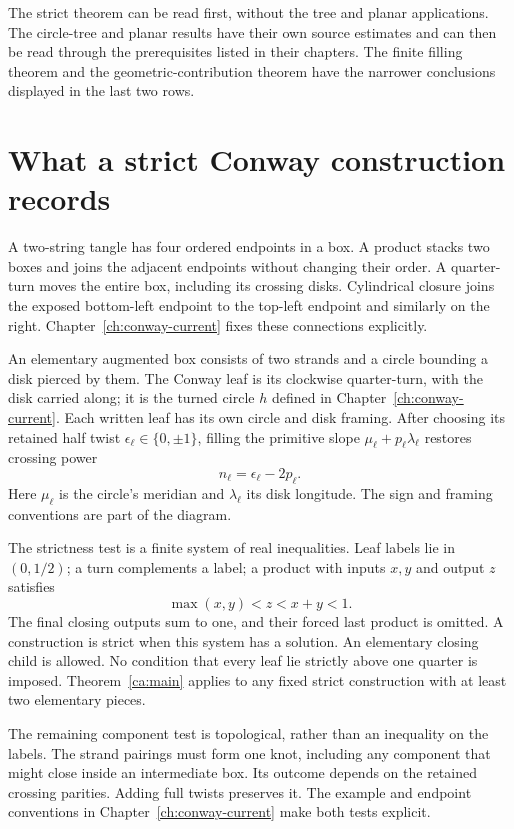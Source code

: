 The strict theorem can be read first, without the tree and planar applications.
The circle-tree and planar results have their own source estimates
and can then be read through the prerequisites listed in their
chapters. The finite filling theorem and the geometric-contribution
theorem have the narrower conclusions displayed in the last two
rows.

\section{What a strict Conway construction records}
\label{sec:geometric-construction}

A two-string tangle has four ordered endpoints in a box. A product
stacks two boxes and joins the adjacent endpoints without changing
their order. A quarter-turn moves the entire box, including its
crossing disks. Cylindrical closure joins the exposed bottom-left
endpoint to the top-left endpoint and similarly on the right.
Chapter~\ref{ch:conway-current} fixes these connections explicitly.

An elementary augmented box consists of two strands and a circle
bounding a disk pierced by them. The Conway leaf is its clockwise
quarter-turn, with the disk carried along; it is the turned circle
$h$ defined in Chapter~\ref{ch:conway-current}. Each written leaf has
its own circle and disk framing. After choosing its retained half twist
$\epsilon_\ell\in\{0,\pm1\}$, filling the primitive slope
$\mu_\ell+p_\ell\lambda_\ell$ restores crossing power
\[
                   n_\ell=\epsilon_\ell-2p_\ell.
\]
Here $\mu_\ell$ is the circle's meridian and $\lambda_\ell$ its
disk longitude. The sign and framing conventions are part of the
diagram.

The strictness test is a finite system of real inequalities. Leaf
labels lie in $(0,1/2)$; a turn complements a label; a product with
inputs $x,y$ and output $z$ satisfies
\[
                  \max(x,y)<z<x+y<1.
\]
The final closing outputs sum to one, and their forced last product
is omitted. A construction is strict when this system has a
solution. An elementary closing child is allowed. No condition
that every leaf lie strictly above one quarter is imposed.
Theorem~\ref{ca:main} applies to any fixed strict construction
with at least two elementary pieces.

The remaining component test is topological, rather than an
inequality on the labels. The strand pairings must form one knot,
including any component that might close inside an intermediate
box. Its outcome depends on the retained crossing parities.
Adding full twists preserves it. The example and endpoint
conventions in Chapter~\ref{ch:conway-current} make both tests
explicit.

